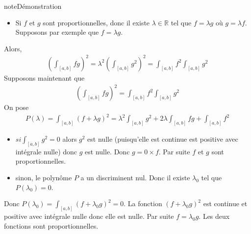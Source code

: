 \documentclass[letterpaper,10pt,french]{sphinxmanual}
\begin{document}
\begin{sphinxadmonition}{note}{Démonstration}
\begin{itemize}
\item {} 
\sphinxAtStartPar
Si \(f\) et \(g\) sont proportionnelles, donc il existe \(\lambda \in \mathbb R\) tel que \(f=\lambda g\) où  \(g=\lambda f\). Supposons par exemple que \(f=\lambda g\).

\end{itemize}

\sphinxAtStartPar
Alors,
\begin{equation*}
\begin{split}
\left(\int_{[a, b]} fg \right)^2 = \lambda^2\left(\int_{[a, b]} g^2\right)^2 = \int_{[a, b]} f^2\int_{[a, b]} g^2
\end{split}
\end{equation*}
\sphinxAtStartPar
Supposons maintenant que
\begin{equation*}
\begin{split}
\left (\int_{[a, b]}fg \right ) ^2 = \int_{[a, b]} f^2 \int_{[a, b]}g^2
\end{split}
\end{equation*}
\sphinxAtStartPar
On pose
\begin{equation*}
\begin{split}
P(\lambda) = \int_{[a, b]}(f+\lambda g)^2 = \lambda^2\int_{[a, b]}g^2 + 2\lambda \int_{[a, b]}fg + \int_{[a, b]}f^2
\end{split}
\end{equation*}\begin{itemize}
\item {} 
\sphinxAtStartPar
\(si \int_{[a, b]}g^2 = 0\) alors \(g^2\) est nulle (puisqu’elle est continue est positive avec intégrale nulle) donc \(g\) est nulle. Donc \(g= 0\times f\). Par suite \(f\) et \(g\) sont proportionnelles.

\item {} 
\sphinxAtStartPar
sinon, le polynôme \(P\) a un discriminent nul. Donc il existe \(\lambda_0\) tel que \(P(\lambda_0)=0\).

\end{itemize}

\sphinxAtStartPar
Donc \(P(\lambda_0) = \int_{[a, b]}(f+\lambda_0 g)^2 = 0\). La fonction \((f+\lambda_0 g)^2\) est continue et positive avec intégrale nulle donc elle est nulle. Par suite \(f=\lambda_0 g\). Les deux fonctions sont proportionnelles.
\end{sphinxadmonition}
\end{document}
